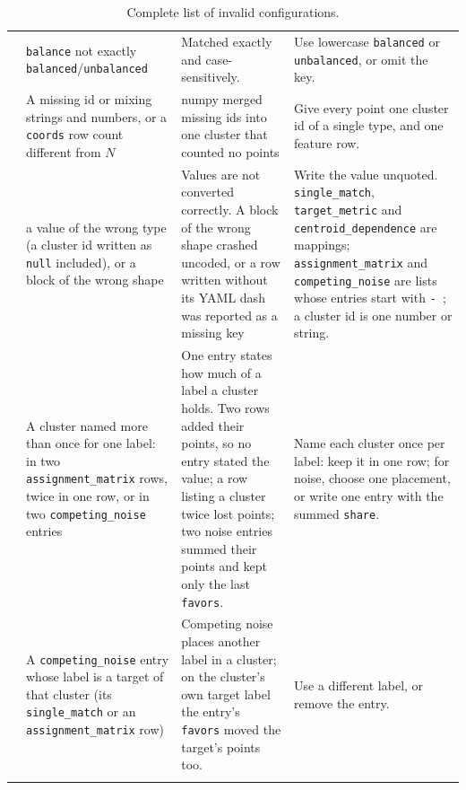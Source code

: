 \documentclass[a4paper,11pt]{article}
\newcommand{\vcode}[1]{\textcolor{valred}{\bfseries\ttfamily #1}}
\begin{document}
\begin{longtable}{@{}L{1.0cm} L{3.5cm} L{4.6cm} L{5.4cm}@{}}
\vcode{132} & \texttt{balance} not exactly \texttt{balanced}/\texttt{unbalanced} & Matched exactly and case-sensitively. & Use lowercase \texttt{balanced} or \texttt{unbalanced}, or omit the key. \\
\vcode{133} & A missing id or mixing strings and numbers, or a \texttt{coords} row count different from $N$ & numpy merged missing ids into one cluster that counted no points & Give every point one cluster id of a single type, and one feature row.\\
\vcode{141} & a value of the wrong type (a cluster id written as \texttt{null} included), or a block of the wrong shape & Values are not converted correctly. A block of the wrong shape crashed uncoded, or a row written without its YAML dash was reported as a missing key & Write the value unquoted. \texttt{single\_match}, \texttt{target\_metric} and \texttt{centroid\_dependence} are mappings; \texttt{assignment\_matrix} and \texttt{competing\_noise} are lists whose entries start with \texttt{- }; a cluster id is one number or string. \\
\vcode{142} & A cluster named more than once for one label: in two \texttt{assignment\_matrix} rows, twice in one row, or in two \texttt{competing\_noise} entries & One entry states how much of a label a cluster holds. Two rows added their points, so no entry stated the value; a row listing a cluster twice lost points; two noise entries summed their points and kept only the last \texttt{favors}. & Name each cluster once per label: keep it in one row; for noise, choose one placement, or write one entry with the summed \texttt{share}. \\
\vcode{144} & A \texttt{competing\_noise} entry whose label is a target of that cluster (its \texttt{single\_match} or an \texttt{assignment\_matrix} row) & Competing noise places another label in a cluster; on the cluster's own target label the entry's \texttt{favors} moved the target's points too. & Use a different label, or remove the entry. \\
\bottomrule
\caption{Complete list of invalid configurations.}
\label{LIC}
\end{longtable}

\newpage
\end{document}
